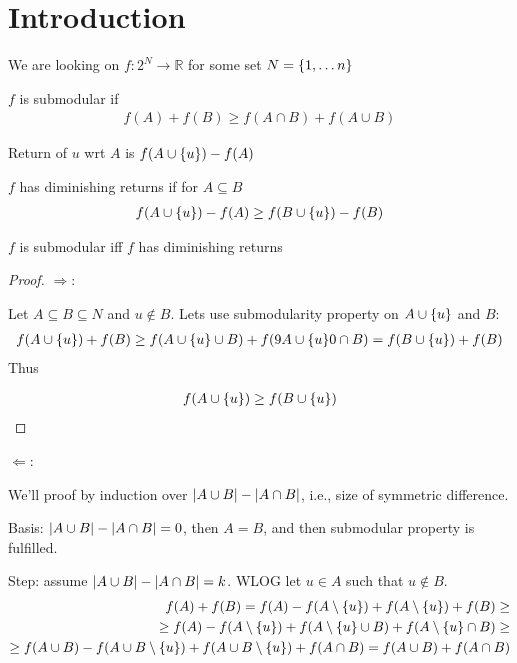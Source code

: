 \section{Introduction}
We are looking on $f: 2^N \to \mathbb{R}$ for some set $N = \qty{1, \dots n }$
\begin{definition}
	$f$ is submodular if 
	\begin{align}
	f(A)+f(B) \geq f(A\cap B) + f(A\cup B)
	\end{align}
\end{definition}

\begin{definition}
	Return of $u$ wrt $A$ is $f(A \cup \qty{u }) - f(A)$
	
\end{definition}
\begin{definition}
$f$ has diminishing returns if for $A\subseteq B$
\begin{align}
f(A \cup \qty{u }) - f(A) \geq f(B \cup \qty{u }) - f(B)
\end{align}
\end{definition}

\begin{prop}
	$f$ is submodular iff $f$ has diminishing returns
	\begin{proof}
		$\Rightarrow$:
		
		Let $A\subseteq B \subseteq N$ and $u\notin B$. Lets use submodularity property on $A\cup \qty{ u }$ and $B$:
		\begin{align}
		f(A\cup \qty{ u }) + f(B) \geq f\qty(A\cup \qty{ u } \cup B) + f\qty(9A\cup \qty{ u }0 \cap B)  = f\qty(B\cup \qty{ u }) + f(B)  
		\end{align}
		Thus
		
		\begin{align}
		f(A\cup \qty{ u }) \geq f\qty(B\cup \qty{ u })  
		\end{align}
	\end{proof}


$\Leftarrow$:

We'll proof by induction over $\abs{A\cup B} - \abs{A\cap B}$, i.e., size of symmetric difference.

Basis: $\abs{A\cup B} - \abs{A\cap B} = 0$, then $A=B$, and then submodular property is fulfilled.

Step: assume $\abs{A\cup B} - \abs{A\cap B} = k$. WLOG let $u\in A$ such that $u\notin B$.
\begin{align}
f(A) + f(B) = f(A) - f(A \setminus \qty{u}) + f(A \setminus  \qty{u}) + f(B) \geq\\\geq  f(A) - f(A \setminus \qty{u}) + f(A \setminus  \qty{u} \cup B) + f(A \setminus  \qty{u}  \cap B) \geq\\\geq f(A\cup B) -  f(A\cup B \setminus \qty{ u }) + f(A  \cup B \setminus  \qty{u} ) + f(A  \cap B) = f(A\cup B) + f(A\cap B)
\end{align}
\end{prop}

